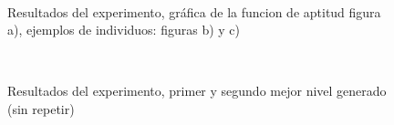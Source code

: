 \begin{figure}[htbp]
    \begin{center}
        \\%
            
    \end{center}
    \caption{Resultados del experimento, gráfica de la funcion de aptitud figura a), ejemplos de individuos: figuras b) y c)}
    \label{figure:exp_02_a}
\end{figure}
\begin{figure}[htbp]
    \begin{center}
        \\%
    \end{center}
    \caption{Resultados del experimento, primer y segundo mejor nivel generado (sin repetir)}
    \label{figure:exp_02_b}
\end{figure}

